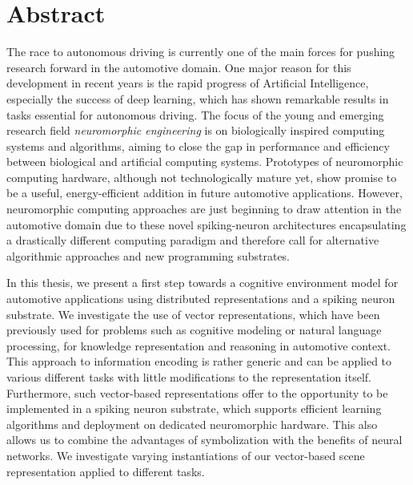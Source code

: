 \chapter*{Abstract}

The race to autonomous driving is currently one of the main forces for pushing research forward in the automotive domain.
One major reason for this development in recent years is the rapid progress of Artificial Intelligence, especially the success of deep learning, which has shown remarkable results in tasks essential for autonomous driving.
The focus of the young and emerging research field \emph{neuromorphic engineering} is on biologically inspired computing systems and algorithms, aiming to close the gap in performance and efficiency between biological and artificial computing systems.
Prototypes of neuromorphic computing hardware, although not technologically mature yet, show promise to be a useful, energy-efficient addition in future automotive applications.
However, neuromorphic computing approaches are just beginning to draw attention in the automotive domain due to these novel spiking-neuron architectures encapsulating a drastically different computing paradigm and therefore call for alternative algorithmic approaches and new programming substrates.

In this thesis, we present a first step towards a cognitive environment model for automotive applications using distributed representations and a spiking neuron substrate.
We investigate the use of vector representations, which have been previously used for problems such as cognitive modeling or natural language processing, for knowledge representation and reasoning in automotive context.
This approach to information encoding is rather generic and can be applied to various different tasks with little modifications to the representation itself.
Furthermore, such vector-based representations offer to the opportunity to be implemented in a spiking neuron substrate, which supports efficient learning algorithms and deployment on dedicated neuromorphic hardware.
This also allows us to combine the advantages of symbolization with the benefits of neural networks.
We investigate varying instantiations of our vector-based scene representation applied to different tasks.


